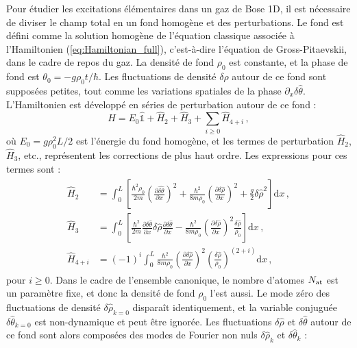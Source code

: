 \documentclass[aps,prd,notitlepage,amsfonts,amssymb,amsmath,nofootinbib,superscriptaddress,longbibliography]{revtex4-2}
\newcommand{\resumefr}[1]{\textcolor{resumecolor}{#1}}
\begin{document}
\resumefr{
Pour étudier les excitations élémentaires dans un gaz de Bose 1D, il est nécessaire de diviser le champ total en un fond homogène et des perturbations. Le fond est défini comme la solution homogène de l'équation classique associée à l'Hamiltonien (\ref{eq:Hamiltonian_full}), c'est-à-dire l'équation de Gross-Pitaevskii, dans le cadre de repos du gaz. La densité de fond $\rho_0$ est constante, et la phase de fond est $\theta_0 = - g \rho_0 t / \hbar$. Les fluctuations de densité $\delta \hat{\rho}$ autour de ce fond sont supposées petites, tout comme les variations spatiales de la phase $\partial_x \delta \hat{\theta}$.
L'Hamiltonien est développé en séries de perturbation autour de ce fond :
\begin{equation}
	\hat{H} = E_{0} \hat{\mathds{1}} + \hat{H}_{2} + \hat{H}_{3} + \sum_{i \geq 0} \hat{H}_{4+i} \,,
\end{equation}
où $E_{0} = g \rho_{0}^{2} L / 2$ est l'énergie du fond homogène, et les termes de perturbation $\hat{H}_{2}$, $\hat{H}_{3}$, etc., représentent les corrections de plus haut ordre. Les expressions pour ces termes sont :
\begin{align}
	\begin{split}
		\hat{H}_{2} & = \int_{0}^{L} \left[ \frac{\hbar^2 \rho_0}{2m}\left(  \frac{\partial \hat{\delta \theta} }{\partial x} \right)^2  + \frac{\hbar^2}{8 m \rho_0 } \left( \frac{\partial \delta \hat{\rho} }{\partial x} \right)^2  +  \frac{g}{2} \delta\hat{\rho}^{2} \right]  \mathrm{d}x  \, , \\
		\hat{H}_{3} & = \int_{0}^{L} \left[ \frac{\hbar^2}{2m} \frac{\partial \delta \hat{\theta} }{\partial x} \delta\hat{\rho} \frac{\partial \delta \hat{\theta} }{\partial x}   - \frac{\hbar^2}{8 m \rho_0} \left( \frac{\partial \delta \hat{\rho} }{\partial x} \right)^2  \frac{\delta \hat{\rho}}{\rho_0} \right]  \mathrm{d}x \, , \\
		\hat{H}_{4 + i} & = (-1)^i \int_{0}^{L} \frac{\hbar^2}{8 m \rho_0} \left( \frac{\partial \delta \hat{\rho}}{\partial x}\right)^2  \left( \frac{\delta \hat{\rho}}{\rho_0} \right) ^{(2+i)}  \mathrm{d}x \,, 
	\end{split}
\end{align}
pour $i \geq 0$.
Dans le cadre de l'ensemble canonique, le nombre d'atomes $N_{\rm at}$ est un paramètre fixe, et donc la densité de fond $\rho_{0}$ l'est aussi. Le mode zéro des fluctuations de densité $\delta \hat{\rho}_{k=0}$ disparaît identiquement, et la variable conjuguée $\delta \hat{\theta}_{k=0}$ est non-dynamique et peut être ignorée. Les fluctuations $\delta \hat{\rho}$ et $\delta \hat{\theta}$ autour de ce fond sont alors composées des modes de Fourier non nuls $\delta \hat{\rho}_{k}$ et $\delta \hat{\theta}_{k}$ :
}
\end{document}
